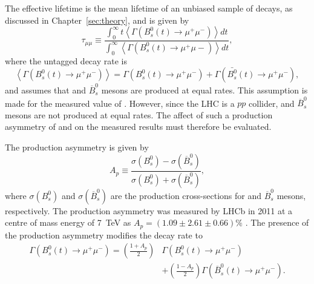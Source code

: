 The \bsmumu effective lifetime is the mean lifetime of an unbiased sample of \bsmumu decays, as discussed in Chapter~\ref{sec:theory}, and is given by
\begin{equation}
 \tau_{\mu\mu} \equiv \frac{\int^\infty_0 t \left<\Gamma \left( B^{0}_s(t) \rightarrow \mu^{+} \mu^{-} \right) \right> dt }{\int^\infty_0 \left<\Gamma \left( B^{0}_s(t) \rightarrow \mu^{+} \mu{-} \right) \right> dt },
\label{eq:el}
\end{equation}
where the untagged decay rate is
\begin{equation}
\left< \Gamma \left( B^0_s(t) \rightarrow \mu^{+} \mu^{-} \right)\right>  = \Gamma \left ( B^0_s(t) \rightarrow \mu^{+}\mu^{-} \right) + \Gamma \left ( \bar{B^0_s}(t) \rightarrow \mu^{+} \mu^{-} \right),
\end{equation}
and assumes that \bs and $\overline{B}^{0}_{s}$ mesons are produced at equal rates. This assumption is made for the measured value of \tmumu. However, since the LHC is a $pp$ collider, \bs and $\overline{B}^{0}_{s}$ mesons are not produced at equal rates. The affect of such a production asymmetry of \bs and on the measured results must therefore be evaluated. 

The production asymmetry is given by 
\begin{equation}
 A_{p} \equiv \frac{\sigma\left(B^{0}_{s}\right) - \sigma\left(\overline{B}^{0}_{s}\right)}{\sigma\left(B^{0}_{s}\right) + \sigma\left(\overline{B}^{0}_{s}\right)},
\label{eq:Ap}
\end{equation}
where $\sigma\left(B^{0}_{s}\right)$ and $\sigma\left(\overline{B}^{0}_{s}\right)$ are the production cross-sections for \bs and $\overline{B}^{0}_{s}$ mesons, respectively. The production asymmetry was measured by LHCb in 2011 at a centre of mass energy of 7~TeV as $ A_{p} = (1.09 \pm 2.61 \pm 0.66) \%$ \cite{Aaij:2014bba}. The presence of the production asymmetry modifies the \bsmumu decay rate to
\begin{align}
\Gamma\left( B^0_s(t) \rightarrow \mu^{+}\mu^{-}\right) = \left(\frac{1+A_p}{2}\right)&\Gamma(B^0_s(t)\rightarrow \mu^{+} \mu^{-}) \nonumber \\
&  + \left(\frac{1-A_p}{2}\right)\Gamma(\overline{B}^0_s(t)\rightarrow \mu^{+} \mu^{-}).
\label{eq:modifieddecayrate}
\end{align}

